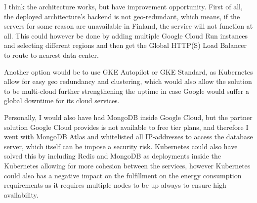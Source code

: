 \documentclass[11pt]{article}
\begin{document}
I think the architecture works, but have improvement opportunity. First of all, the deployed architecture's backend is not geo-redundant, which means, if the servers for some reason are unavailable in Finland, the service will not function at all. This could however be done by adding multiple Google Cloud Run instances and selecting different regions and then get the Global HTTP(S) Load Balancer to route to nearest data center.

Another option would be to use GKE Autopilot or GKE Standard, as Kubernetes allow for easy geo redundancy and clustering, which would also allow the solution to be multi-cloud further strengthening the uptime in case Google would suffer a global downtime for its cloud services.

Personally, I would also have had MongoDB inside Google Cloud, but the partner solution Google Cloud provides is not available to free tier plans, and therefore I went with MongoDB Atlas and whitelisted all IP-addresses to access the database server, which itself can be impose a security risk. Kubernetes could also have solved this by including Redis and MongoDB as deployments inside the Kubernetes allowing for more cohesion between the services, however Kubernetes could also has a negative impact on the fulfillment on the energy consumption requirements as it requires multiple nodes to be up always to ensure high availability.

\newpage
\listoffigures
\listoftables
\end{document}
